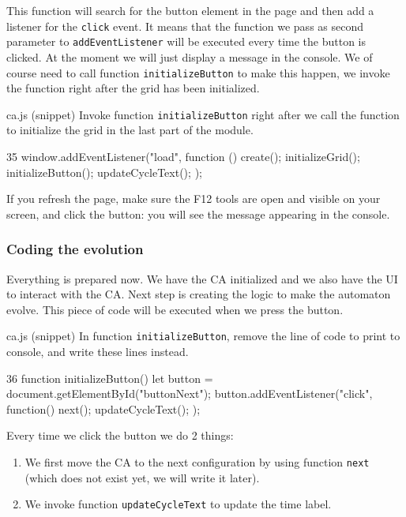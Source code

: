 This function will search for the button element in the page and then add a listener for the \texttt{click}
event. It means that the function we pass as second parameter to \texttt{addEventListener} will be executed
every time the button is clicked. At the  moment we will just display a message in the console. We
of course need to call function \texttt{initializeButton} to make this happen, we invoke the function
right after the grid has been initialized.

\begin{programcode}{ca.js (snippet)}
Invoke function \texttt{initializeButton} right after we call the function to initialize the grid in
the last part of the module.
\begin{codeh1}{3}{5}
window.addEventListener("load", function () {
  create();
  initializeGrid();
  initializeButton();
  updateCycleText();
});
\end{codeh1}
\end{programcode}

If you refresh the page, make sure the F12 tools are open and visible on your screen, and click the button:
you will see the message appearing in the console.

\subsubsection{Coding the evolution}
Everything is prepared now. We have the CA initialized and we also have the UI to interact with the CA.
Next step is creating the logic to make the automaton evolve.
This piece of code will be executed when we press the button.

\begin{programcode}{ca.js (snippet)}
In function \texttt{initializeButton}, remove the line of code to print to console, and write these lines
instead.
\begin{codeh1}{3}{6}
function initializeButton() {
  let button = document.getElementById("buttonNext");
  button.addEventListener("click", function(){
    next();
    updateCycleText();
  });
}
\end{codeh1}
\end{programcode}

Every time we click the button we do 2 things:

\begin{enumerate}
\item We first move the CA to the next configuration by using
function \texttt{next} (which does not exist yet, we will write it later).
\item We invoke function \texttt{updateCycleText} to update the time label.
\end{enumerate}

